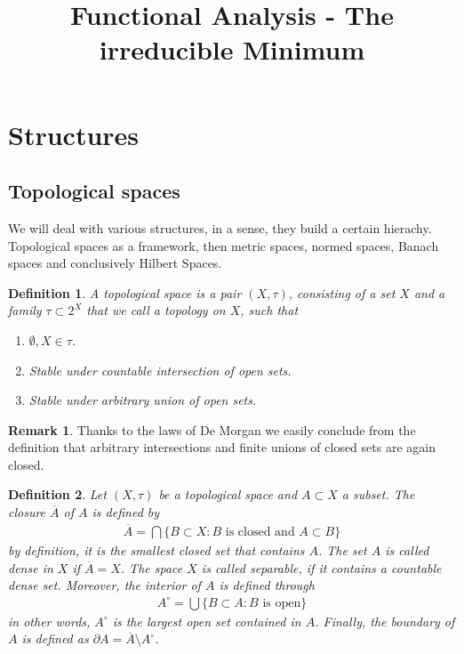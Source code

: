 \documentclass[11pt,a4paper]{article}
\title{Functional Analysis - The irreducible Minimum}
\date{}
\newtheorem{defn}{Definition}[section]
\theoremstyle{definition}
\newtheorem{rem}{Remark}[section]
\begin{document}
\maketitle
\section{Structures}
\subsection{Topological spaces}
We will deal with various structures, in a sense, they build a certain hierachy. Topological spaces as a framework, then metric spaces, normed spaces, Banach spaces and conclusively Hilbert Spaces. 

\begin{defn} A topological space is a pair $(X, \tau)$, consisting of a set $X$ and a family $\tau \subset 2^X$ that we call a topology on $X$, such that 
\begin{enumerate}
\item $\emptyset, X \in \tau$.
\item Stable under countable intersection of open sets.
\item Stable under arbitrary union of open sets.
\end{enumerate}

\end{defn}
\begin{rem} Thanks to the laws of De Morgan we easily conclude from the definition that arbitrary intersections and finite unions of closed sets are again closed. 
\end{rem}
\begin{defn}
Let $(X, \tau)$ be a topological space and $A \subset X$ a subset. The closure $\overline{A}$ of $A$ is defined by 
\begin{align*}
\overline{A}= \bigcap \lbrace B \subset X : B \text{ is closed and } A \subset B \rbrace
\end{align*}
by definition, it is the smallest closed set that contains $A$. The set $A$ is called dense in $X$ if $\overline{A}=X$. The space $X$ is called separable, if it contains a countable dense set. Moreover, the interior of $A$ is defined through
\begin{align*}
A^\circ = \bigcup \lbrace B \subset A : B \text{ is open} \rbrace
\end{align*}
in other words, $A^\circ$ is the largest open set contained in $A$. Finally, the boundary of $A$ is defined as $\partial A = \overline{A} \setminus A^\circ$. 
\end{defn}
\end{document}
